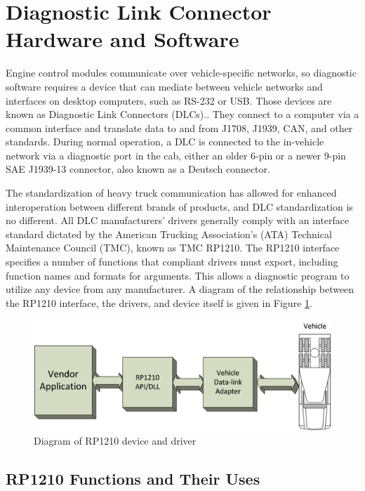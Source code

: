 \section{Diagnostic Link Connector Hardware and Software}

Engine control modules communicate over vehicle-specific networks, so diagnostic software requires a device that can mediate between
vehicle networks and interfaces on desktop computers, such as RS-232 or USB. Those devices are known as Diagnostic Link Connectors (DLCs)..
They connect to a computer via a common interface and translate data to and from J1708, J1939, CAN, and other standards. During normal
operation, a DLC is connected to the in-vehicle network via a diagnostic port in the cab, either an older 6-pin or a newer 9-pin SAE J1939-13 connector,
also known as a Deutsch connector.

The standardization of heavy truck communication has allowed for enhanced interoperation between different brands of products, and DLC
standardization is no different. All DLC manufacturers' drivers generally comply with an interface standard dictated by the American Trucking Association's (ATA)
Technical Maintenance Council (TMC), known as TMC RP1210\cite{RP1210}. The RP1210 interface specifies a number of functions that compliant drivers must export,
including function names and formats for arguments. This allows a diagnostic program to utilize any device from any manufacturer. A diagram of the relationship between
the RP1210 interface, the drivers, and device itself is given in Figure \ref{fig:rp1210}.

\begin{figure}[h]
  \centering
  \includegraphics{RP1210}
  \caption{Diagram of RP1210 device and driver}
  \label{fig:rp1210}
\end{figure}

\subsection{RP1210 Functions and Their Uses}

